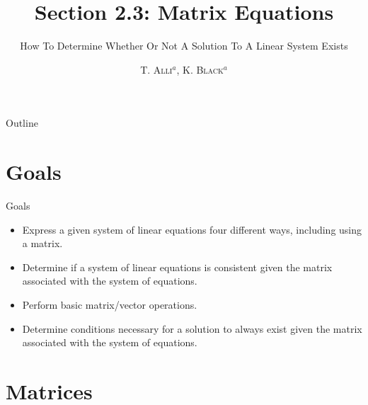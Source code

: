 \documentclass[svgnames,table,,aspectratio=169]{beamer}
\begin{document}
\author{\textsc{T. Alli$^{a}$, K. Black$^{a}$}}
\subject{Linear Algebra}


\title{Section 2.3: Matrix Equations}
\subtitle{How To Determine Whether Or Not A Solution To A Linear
  System Exists}


\date{} %

\begin{frame}
  \titlepage
\end{frame}

\begin{frame}{Outline}
  \tableofcontents
\end{frame}


\section{Goals}

\begin{frame}{Goals}

  \begin{itemize}
  \item Express a given system of linear equations four different
    ways, including using a matrix.
  \item Determine if a system of linear equations is consistent given the
    matrix associated with the system of equations.
  \item Perform basic matrix/vector operations.
  \item Determine conditions necessary for a solution to always exist
    given the matrix associated with the system of equations.
  \end{itemize}

\end{frame}

\section{Matrices}
\end{document}

